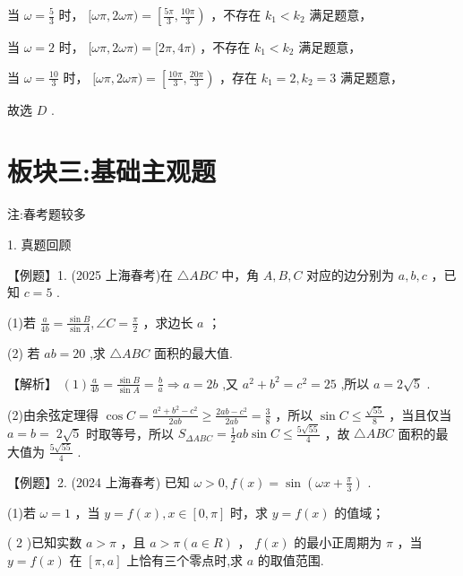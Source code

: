 \documentclass[10pt]{article}
\begin{document}
当 \(\omega  = \frac{5}{3}\) 时， \(\lbrack {\omega \pi },{2\omega \pi }) = \left\lbrack  {\frac{5\pi }{3},\frac{10\pi }{3}}\right)\) ，不存在 \({k}_{1} < {k}_{2}\) 满足题意，

当 \(\omega  = 2\) 时， \(\lbrack {\omega \pi },{2\omega \pi }) = \lbrack {2\pi },{4\pi })\) ，不存在 \({k}_{1} < {k}_{2}\) 满足题意，

当 \(\omega  = \frac{10}{3}\) 时， \(\lbrack {\omega \pi },{2\omega \pi }) = \left\lbrack  {\frac{10\pi }{3},\frac{20\pi }{3}}\right)\) ，存在 \({k}_{1} = 2,{k}_{2} = 3\) 满足题意，

故选 \(D\) .

\section*{板块三:基础主观题}

注:春考题较多

1. 真题回顾

【例题】1. (2025 上海春考)在 \(\bigtriangleup  {ABC}\) 中，角 \(A,B,C\) 对应的边分别为 \(a,b,c\) ，已知 \(c = 5\) .

(1)若 \(\frac{a}{4b} = \frac{\sin B}{\sin A},\angle C = \frac{\pi }{2}\) ，求边长 \(a\) ；

(2) 若 \({ab} = {20}\) ,求 \(\bigtriangleup {ABC}\) 面积的最大值.

【解析】 \(\left( 1\right) \frac{a}{4b} = \frac{\sin B}{\sin A} = \frac{b}{a} \Rightarrow  a = {2b}\) ,又 \({a}^{2} + {b}^{2} = {c}^{2} = {25}\) ,所以 \(a = 2\sqrt{5}\) .

(2)由余弦定理得 \(\cos C = \frac{{a}^{2} + {b}^{2} - {c}^{2}}{2ab} \geq  \frac{{2ab} - {c}^{2}}{2ab} = \frac{3}{8}\) ，所以 \(\sin C \leq  \frac{\sqrt{55}}{8}\) ，当且仅当 \(a = b = \; 2\sqrt{5}\) 时取等号，所以 \({S}_{\Delta ABC} = \frac{1}{2}{ab}\sin C \leq  \frac{5\sqrt{55}}{4}\) ，故 \(\bigtriangleup  {ABC}\) 面积的最大值为 \(\frac{5\sqrt{55}}{4}\) .

【例题】2. (2024 上海春考) 已知 \(\omega  > 0,f\left( x\right)  = \sin \left( {{\omega x} + \frac{\pi }{3}}\right)\) .

(1)若 \(\omega  = 1\) ，当 \(y = f\left( x\right) ,x \in  \left\lbrack  {0,\pi }\right\rbrack\) 时，求 \(y = f\left( x\right)\) 的值域；

( 2 )已知实数 \(a > \pi\) ，且 \(a > \pi \left( {a \in  R}\right)\) ， \(f\left( x\right)\) 的最小正周期为 \(\pi\) ，当 \(y = f\left( x\right)\) 在 \(\left\lbrack  {\pi ,a}\right\rbrack\) 上恰有三个零点时,求 \(a\) 的取值范围.
\end{document}
